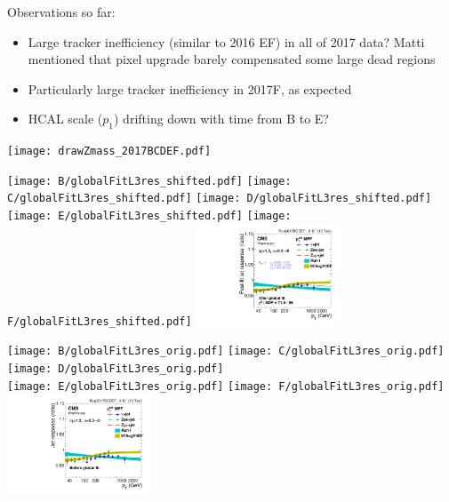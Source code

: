 \documentclass[landscape,10pt]{beamer} %
\begin{document}
Observations so far:
\begin{itemize}
\item Large tracker inefficiency (similar to 2016 EF) in all of 2017 data? Matti mentioned that pixel upgrade barely compensated some large dead regions
\item Particularly large tracker inefficiency in 2017F, as expected
\item HCAL scale ($p_1$) drifting down with time from B to E?
\end{itemize}


\newpage

\texttt{[image: drawZmass\_2017BCDEF.pdf]}




\texttt{[image: B/globalFitL3res\_shifted.pdf]}
\texttt{[image: C/globalFitL3res\_shifted.pdf]}
\texttt{[image: D/globalFitL3res\_shifted.pdf]}\\
\texttt{[image: E/globalFitL3res\_shifted.pdf]}
\texttt{[image: F/globalFitL3res\_shifted.pdf]}
\includegraphics[width=0.32\textwidth]{BCDEF/globalFitL3res_shifted.pdf}\\

\newpage

\texttt{[image: B/globalFitL3res\_orig.pdf]}
\texttt{[image: C/globalFitL3res\_orig.pdf]}
\texttt{[image: D/globalFitL3res\_orig.pdf]}\\
\texttt{[image: E/globalFitL3res\_orig.pdf]}
\texttt{[image: F/globalFitL3res\_orig.pdf]}
\includegraphics[width=0.32\textwidth]{BCDEF/globalFitL3res_orig.pdf}\\
\newpage
\end{document}
